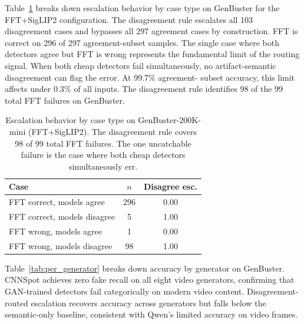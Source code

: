 \documentclass{ieeeaccess}
\begin{document}
Table~\ref{tab:escalation} breaks down escalation behavior by case type on GenBuster for
the FFT+SigLIP2 configuration. The disagreement rule escalates all 103 disagreement cases
and bypasses all 297 agreement cases by construction. FFT is correct on 296 of 297
agreement-subset samples. The single case where both detectors agree but FFT is wrong
represents the fundamental limit of the routing signal. When both cheap detectors fail
simultaneously, no artifact-semantic disagreement can flag the error. At 99.7\% agreement-
subset accuracy, this limit affects under 0.3\% of all inputs. The disagreement rule
identifies 98 of the 99 total FFT failures on GenBuster.

\begin{table}[h]
\centering
\caption{Escalation behavior by case type on GenBuster-200K-mini (FFT+SigLIP2).
The disagreement rule covers 98 of 99 total FFT failures. The one uncatchable failure
is the case where both cheap detectors simultaneously err.}
\label{tab:escalation}
\begin{tabular}{lcc}
\toprule
Case & $n$ & Disagree esc. \\
\midrule
FFT correct, models agree    & 296 & 0.00 \\
FFT correct, models disagree &   5 & 1.00 \\
FFT wrong, models agree      &   1 & 0.00 \\
FFT wrong, models disagree   &  98 & 1.00 \\
\bottomrule
\end{tabular}
\end{table}

Table~\ref{tab:per_generator} breaks down accuracy by generator on GenBuster.
CNNSpot achieves zero fake recall on all eight video generators, confirming that
GAN-trained detectors fail categorically on modern video content. Disagreement-routed
escalation recovers accuracy across generators but falls below the semantic-only
baseline, consistent with Qwen's limited accuracy on video frames.
\end{document}
